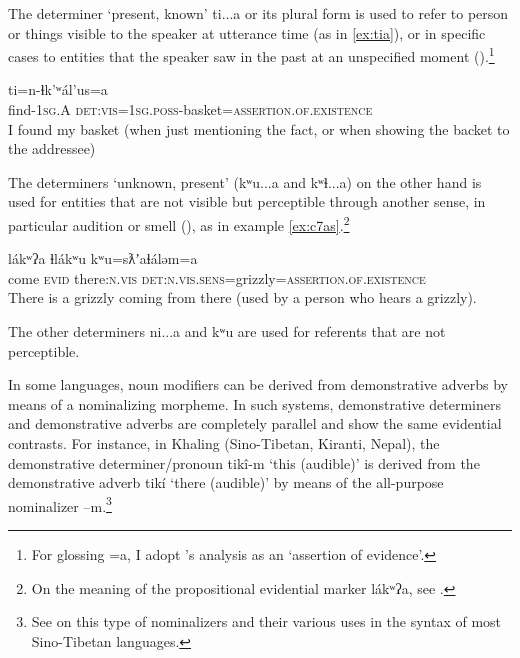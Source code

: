 \documentclass[oneside,a4paper,11pt]{article}
\newcommand{\ipa}[1]{{\phon \mbox{#1}}} %
\begin{document}
 The determiner `present, known' \ipa{ti...a} or its plural form is used to refer to person or things visible to the speaker at utterance time (as in \ref{ex:tia}), or in specific cases to entities that the speaker saw in the past at an unspecified moment (\citealt[193]{eijk97lillooet}).\footnote{For glossing \ipa{=a}, I adopt \citet{matthewson98determiners}'s analysis as an `assertion of evidence'. }
 
\begin{exe}
\ex \label{ex:tia}
\gll \ipa{pún-ɬkan} 	\ipa{ti=n-ɬk'ʷál'us=a} \\
find-\textsc{1sg.A} \textsc{det:vis=1sg.poss}-basket=\textsc{assertion.of.existence} \\
\glt I found my basket (when just mentioning the fact, or when showing the backet to the addressee)
\end{exe}

The determiners `unknown, present' (\ipa{kʷu...a} and \ipa{kʷɬ...a}) on the other hand is used for entities that are not visible but perceptible through another sense, in particular audition or smell (\citealt[195]{eijk97lillooet}), as in example \ref{ex:c7as}.\footnote{On the meaning of the propositional evidential marker 	\ipa{lákʷʔa}, see \citet{matthewson10lakw7a}.}

\begin{exe}
\ex \label{ex:c7as}
\gll \ipa{cʔas} 	\ipa{lákʷʔa} 	\ipa{ɬlákʷu} 	\ipa{kʷu=sƛʼaɬáləm=a} \\
 come \textsc{evid} there:\textsc{n.vis} \textsc{det:n.vis.sens}=grizzly=\textsc{assertion.of.existence} \\
\glt There is a grizzly coming from there (used by a person who hears a grizzly).
\end{exe}

The other determiners \ipa{ni...a} and \ipa{kʷu} are used for referents that are not perceptible.

In some languages, noun modifiers can be derived from demonstrative adverbs by means of a nominalizing morpheme. In such systems, demonstrative determiners and demonstrative adverbs are completely parallel and show the same evidential contrasts. For instance, in Khaling (Sino-Tibetan, Kiranti, Nepal), the demonstrative determiner/pronoun \ipa{tikî-m} `this (audible)' is derived from the demonstrative adverb \ipa{tikí} `there (audible)' by means of the all-purpose nominalizer \ipa{--m}.\footnote{See \citet{bickel99nmlz} on this type of nominalizers and their various uses in the syntax of most Sino-Tibetan languages.}
\end{document}
